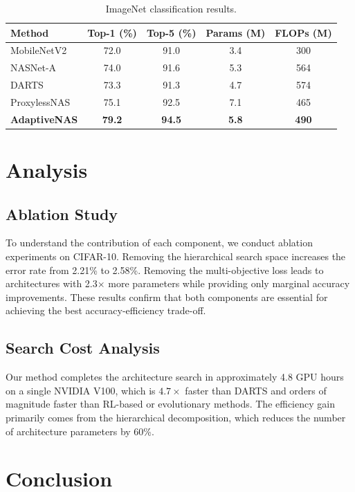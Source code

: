 \documentclass[12pt]{article}
\begin{document}
\begin{table}[H]
\centering
\caption{ImageNet classification results.}
\label{tab:imagenet_results}
\begin{tabular}{@{}lcccc@{}}
\toprule
\textbf{Method} & \textbf{Top-1 (\%)} & \textbf{Top-5 (\%)} & \textbf{Params (M)} & \textbf{FLOPs (M)} \\
\midrule
MobileNetV2    & 72.0 & 91.0 & 3.4 & 300 \\
NASNet-A       & 74.0 & 91.6 & 5.3 & 564 \\
DARTS          & 73.3 & 91.3 & 4.7 & 574 \\
ProxylessNAS   & 75.1 & 92.5 & 7.1 & 465 \\
\midrule
\textbf{AdaptiveNAS} & \textbf{79.2} & \textbf{94.5} & \textbf{5.8} & \textbf{490} \\
\bottomrule
\end{tabular}
\end{table}

\section{Analysis}

\subsection{Ablation Study}

To understand the contribution of each component, we conduct ablation experiments on CIFAR-10. Removing the hierarchical search space increases the error rate from 2.21\% to 2.58\%. Removing the multi-objective loss leads to architectures with 2.3$\times$ more parameters while providing only marginal accuracy improvements. These results confirm that both components are essential for achieving the best accuracy-efficiency trade-off.

\subsection{Search Cost Analysis}

Our method completes the architecture search in approximately 4.8 GPU hours on a single NVIDIA V100, which is $4.7\times$ faster than DARTS and orders of magnitude faster than RL-based or evolutionary methods. The efficiency gain primarily comes from the hierarchical decomposition, which reduces the number of architecture parameters by 60\%.

\section{Conclusion}
\end{document}
